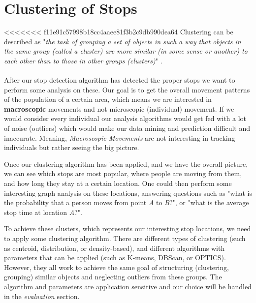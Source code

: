 \section{Clustering of Stops}

<<<<<<< f11e91c57998b18cc4aaee81f3b2c9db990dea64
Clustering can be described as "\textit{the task of grouping a set of objects in such a way that objects in the same group (called a cluster) are more similar (in some sense or another) to each other than to those in other groups (clusters)}" \cite{clustering}. 
\\\\
After our stop detection algorithm has detected the proper stops we want to perform some analysis on these. Our goal is to get the overall movement patterns of the population of a certain area, which means we are interested in \textbf{macroscopic} movements and not microscopic (individual) movement. If we would consider every individual our analysis algorithms would get fed with a lot of noise (outliers) which would make our data mining and prediction difficult and inaccurate. Meaning, \textit{Macroscopic Movements} are not interesting in tracking individuals but rather seeing the big picture.

 Once our clustering algorithm has been applied, and we have the overall picture, we can see which stops are most popular, where people are moving from them, and how long they stay at a certain location. One could then perform some interesting graph analysis on these locations, answering questions such as "what is the probability that a person moves from point \textit{A} to \textit{B}?", or "what is the average stop time at location \textit{A}?". 
 
 To achieve these clusters, which represents our interesting stop locations, we need to apply some clustering algorithm. There are different types of clustering (such as centroid, distribution, or density-based), and different algorithms with parameters that can be applied (such as K-means, DBScan, or OPTICS). However, they all work to achieve the same goal of structuring (clustering, grouping) similar objects and neglecting outliers from these groups. The algorithm and parameters are application sensitive and our choice will be handled in the \textit{evaluation} section.

